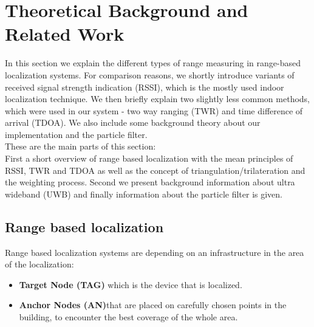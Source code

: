 
\chapter{Theoretical Background and Related Work} %

\label{Chapter2} %
In this section we explain the different types of range measuring in range-based localization systems. For comparison reasons, we shortly introduce variants of received signal strength indication (RSSI), which is the mostly used indoor localization technique. We then briefly explain two slightly less common methods, which were used in our system - two way ranging (TWR) and time difference of arrival (TDOA). We also include some background theory about our implementation and the particle filter.\\
These are the main parts of this section:\\
First a short overview of range based localization with the mean principles of RSSI, TWR and TDOA as well as the concept of triangulation/trilateration and the weighting process. Second we present background information about ultra wideband (UWB) and finally information about the particle filter is given.


\section{Range based localization}

Range based localization systems are depending on an infrastructure in the area of the localization:
\begin{itemize} 
\item \textbf{Target Node (TAG)} which is the device that is localized. 
\item \textbf{Anchor Nodes (AN)}that are placed on carefully chosen points in the building, to encounter the best coverage of the whole area.
\end{itemize}


